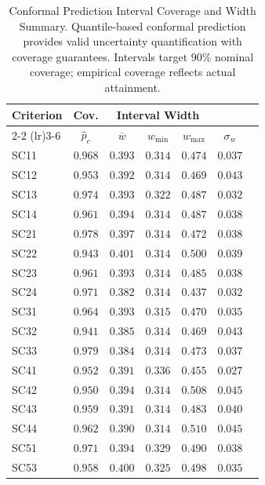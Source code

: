 \begin{table}[!htbp]
\centering
\caption{%
    Conformal Prediction Interval Coverage and Width Summary.
    Quantile-based conformal prediction provides valid uncertainty quantification with coverage guarantees.
    Intervals target $90\%$ nominal coverage; empirical coverage reflects actual attainment.
}
\label{tab:conformal_coverage}
\small
\begin{tabular}{lcccccc}
\toprule
\multicolumn{1}{c}{\textbf{Criterion}} & \textbf{Cov.} 
    & \multicolumn{3}{c}{\textbf{Interval Width}} \\
\cmidrule(lr){2-2}
\cmidrule(lr){3-6}
    & $\hat{p}_c$ & $\overline{w}$ & $w_{\min}$ & $w_{\max}$ & $\sigma_w$ \\
\midrule
SC11  & $0.968$ & $0.393$ & $0.314$ & $0.474$ & $0.037$ \\
SC12  & $0.953$ & $0.392$ & $0.314$ & $0.469$ & $0.043$ \\
SC13  & $0.974$ & $0.393$ & $0.322$ & $0.487$ & $0.032$ \\
SC14  & $0.961$ & $0.394$ & $0.314$ & $0.487$ & $0.038$ \\
SC21  & $0.978$ & $0.397$ & $0.314$ & $0.472$ & $0.038$ \\
SC22  & $0.943$ & $0.401$ & $0.314$ & $0.500$ & $0.039$ \\
SC23  & $0.961$ & $0.393$ & $0.314$ & $0.485$ & $0.038$ \\
SC24  & $0.971$ & $0.382$ & $0.314$ & $0.437$ & $0.032$ \\
SC31  & $0.964$ & $0.393$ & $0.315$ & $0.470$ & $0.035$ \\
SC32  & $0.941$ & $0.385$ & $0.314$ & $0.469$ & $0.043$ \\
SC33  & $0.979$ & $0.384$ & $0.314$ & $0.473$ & $0.037$ \\
SC41  & $0.952$ & $0.391$ & $0.336$ & $0.455$ & $0.027$ \\
SC42  & $0.950$ & $0.394$ & $0.314$ & $0.508$ & $0.045$ \\
SC43  & $0.959$ & $0.391$ & $0.314$ & $0.483$ & $0.040$ \\
SC44  & $0.962$ & $0.390$ & $0.314$ & $0.510$ & $0.045$ \\
SC51  & $0.971$ & $0.394$ & $0.329$ & $0.490$ & $0.038$ \\
SC53  & $0.958$ & $0.400$ & $0.325$ & $0.498$ & $0.035$ \\

\end{tabular}
\end{table}
